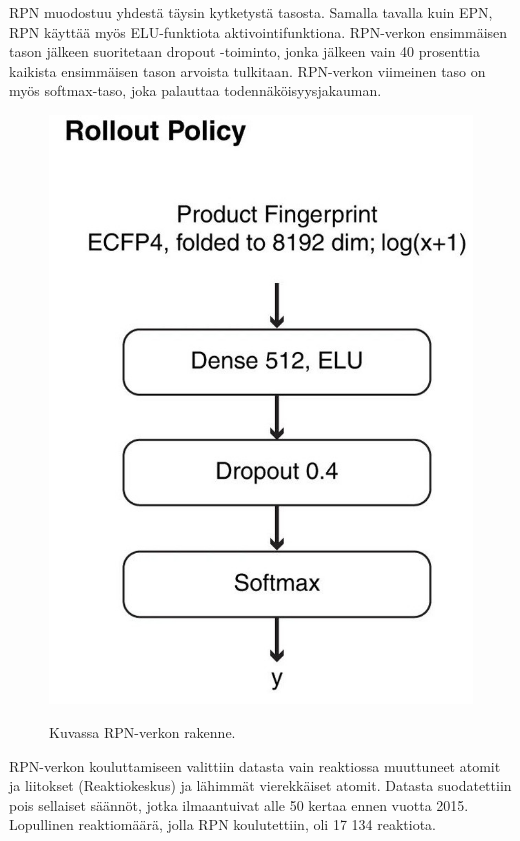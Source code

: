 \documentclass[finnish,twoside,censored,tkt,sw-line]{HYthesisML}
\begin{document}
RPN muodostuu yhdestä täysin kytketystä tasosta.
Samalla tavalla kuin EPN, RPN käyttää myös ELU-funktiota aktivointifunktiona.
RPN-verkon ensimmäisen tason jälkeen suoritetaan dropout -toiminto, jonka jälkeen vain 40 prosenttia kaikista ensimmäisen tason arvoista tulkitaan.
RPN-verkon viimeinen taso on myös softmax-taso, joka palauttaa todennäköisyysjakauman.

\begin{figure}[!ht]
    \centering
    \includegraphics[]{rollout-policy.jpg}
    \caption{Kuvassa RPN-verkon rakenne.}
    {\cite{SeglerMarwinHS2018Pcsw}}
    {\label{fig:3n-mcts-rpn}}
\end{figure}

RPN-verkon kouluttamiseen valittiin datasta vain reaktiossa muuttuneet atomit ja liitokset (Reaktiokeskus) ja lähimmät vierekkäiset atomit.
Datasta suodatettiin pois sellaiset säännöt, jotka ilmaantuivat alle 50 kertaa ennen vuotta 2015.
Lopullinen reaktiomäärä, jolla RPN koulutettiin, oli 17 134 reaktiota.
\end{document}
